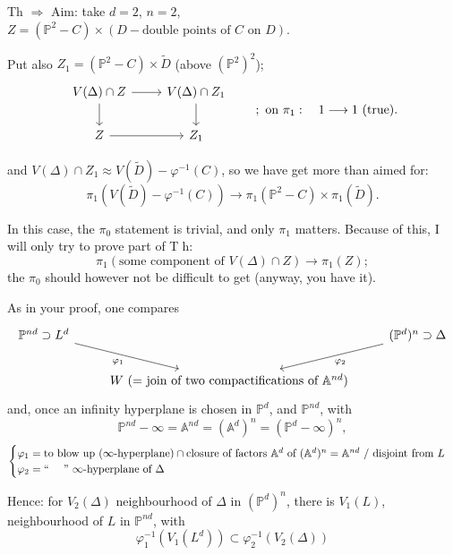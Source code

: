 \documentclass[11pt,a4paper]{article}
\theoremstyle{plain}
\theoremstyle{definition}
\begin{document}
\medskip

Th $\Rightarrow$ Aim: take $d = 2$, $n = 2$, $Z = (\mathbb{P}^2 - C) \times (D - \text{double points of } C \text{ on } D)$.

Put also $Z_1 = (\mathbb{P}^2 - C) \times \widetilde{D}$ (above $(\mathbb{P}^2)^2$);
\[
\begin{tikzcd}
V(\Delta) \cap Z \arrow[r] \arrow[d] & V(\Delta) \cap Z_1 \arrow[d] \\
Z \arrow[r] & Z_1
\end{tikzcd}
\qquad ; \text{ on } \pi_1: \quad 1 \longrightarrow 1 \text{ (true)}.
\]

and $V(\Delta) \cap Z_1 \approx V(\widetilde{D}) - \varphi^{-1}(C)$, so we have get more than aimed for:
\[
\pi_1(V(\widetilde{D}) - \varphi^{-1}(C)) \longrightarrow \pi_1(\mathbb{P}^2 - C) \times \pi_1(\widetilde{D}).
\]

\newpage

In this case, the $\pi_0$ statement is trivial, and only $\pi_1$ matters. Because of this, I will only try to prove part of \textcircled{Th}:
\[
\pi_1(\text{some component of } V(\Delta) \cap Z) \longrightarrow \pi_1(Z);
\]
the $\pi_0$ should however not be difficult to get (anyway, you have it).

\medskip

As in your proof, one compares
\[
\begin{tikzcd}
\mathbb{P}^{nd} \supset L^d \arrow[dr, "\varphi_1"'] & & (\mathbb{P}^d)^n \supset \Delta \arrow[dl, "\varphi_2"] \\
& W \text{ (= join of two compactifications of } \mathbb{A}^{nd})
\end{tikzcd}
\]
and, once an infinity hyperplane is chosen in $\mathbb{P}^d$, and $\mathbb{P}^{nd}$, with
\[
\mathbb{P}^{nd} - \infty = \mathbb{A}^{nd} = (\mathbb{A}^d)^n = (\mathbb{P}^d - \infty)^n,
\]
\[
\begin{cases}
\varphi_1 = \text{to blow up } (\infty\text{-hyperplane}) \cap \text{closure of factors } \mathbb{A}^d \text{ of } (\mathbb{A}^d)^n = \mathbb{A}^{nd} \text{ / disjoint from } L \\
\varphi_2 = \text{`` \quad '' } \infty\text{-hyperplane of } \Delta
\end{cases}
\]

Hence: for $V_2(\Delta)$ neighbourhood of $\Delta$ in $(\mathbb{P}^d)^n$, there is $V_1(L)$, neighbourhood of $L$ in $\mathbb{P}^{nd}$, with
\[
\varphi_1^{-1}(V_1(L^d)) \subset \varphi_2^{-1}(V_2(\Delta))
\]
\end{document}
